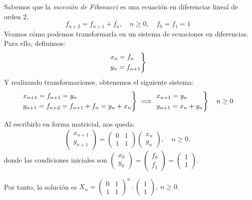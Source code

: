\begin{ejemplo}
  Sabemos que la \textit{sucesión de Fibonacci} es una ecuación en diferencias lineal de orden $2$, $$f_{n+2} = f_{n+1} + f_n,\quad n \ge 0,\quad f_0=f_1=1$$
   Veamos cómo podemos transformarla en un sistema de ecuaciones en diferencias. Para ello, definimos:
  $$
  \begin{rcases}
    x_n = f_n \\
    y_n = f_{n+1}
  \end{rcases}$$
  Y realizando transformaciones, obtenemos el siguiente sistema:
  $$
  \begin{rcases}
    x_{n+1} = f_{n+1} = y_n \\
    y_{n+1} = f_{n+2} = f_{n+1} + f_n = y_n + x_n
  \end{rcases} \implies
  \begin{rcases}
    x_{n+1} = y_n \\
    y_{n+1} = x_n + y_n
  \end{rcases}\quad n \ge 0$$

Al escribirlo en forma matricial, nos queda:
  $$
  \begin{pmatrix}
    x_{n+1} \\
    y_{n+1}
  \end{pmatrix} =
  \begin{pmatrix}
    0 & 1 \\
    1 & 1
  \end{pmatrix}
  \begin{pmatrix}
    x_n \\
    y_n
  \end{pmatrix},\quad n \ge 0,$$ donde las condiciones iniciales son
  $\begin{pmatrix}
    x_0 \\
    y_0
  \end{pmatrix} =
  \begin{pmatrix}
    f_0 \\
f_1
  \end{pmatrix} =
  \begin{pmatrix}
    1 \\
    1
  \end{pmatrix}$.

  Por tanto, la solución es $X_n = \begin{pmatrix}
    0 & 1 \\
    1 & 1
  \end{pmatrix}^n \cdot \begin{pmatrix}
	1 \\
	1
\end{pmatrix}, \ n \ge 0$.

\end{ejemplo}

